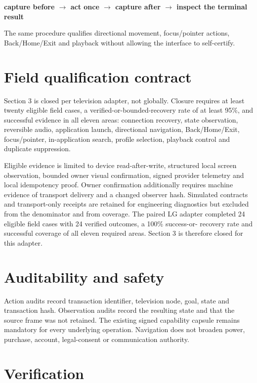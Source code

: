 \documentclass[11pt,a4paper]{article}
\begin{document}
\begin{center}
\textbf{capture before $\rightarrow$ act once $\rightarrow$ capture after
$\rightarrow$ inspect the terminal result}
\end{center}

The same procedure qualifies directional movement, focus/pointer actions,
Back/Home/Exit and playback without allowing the interface to self-certify.

\section{Field qualification contract}

Section 3 is closed per television adapter, not globally.  Closure requires at
least twenty eligible field cases, a verified-or-bounded-recovery rate of at
least 95\%, and successful evidence in all eleven areas: connection recovery,
state observation, reversible audio, application launch, directional navigation,
Back/Home/Exit, focus/pointer, in-application search, profile selection, playback
control and duplicate suppression.

Eligible evidence is limited to device read-after-write, structured local screen
observation, bounded owner visual confirmation, signed provider telemetry and
local idempotency proof. Owner confirmation additionally requires machine evidence
of transport delivery and a changed observer hash. Simulated
contracts and transport-only receipts are retained for engineering diagnostics
but excluded from the denominator and from coverage.  The paired LG adapter
completed 24 eligible field cases with 24 verified outcomes, a 100\% success-or-
recovery rate and successful coverage of all eleven required areas. Section 3 is
therefore closed for this adapter.

\section{Auditability and safety}

Action audits record transaction identifier, television node, goal, state and
transaction hash.  Observation audits record the resulting state and that the
source frame was not retained.  The existing signed capability capsule remains
mandatory for every underlying operation.  Navigation does not broaden power,
purchase, account, legal-consent or communication authority.

\section{Verification}
\end{document}
